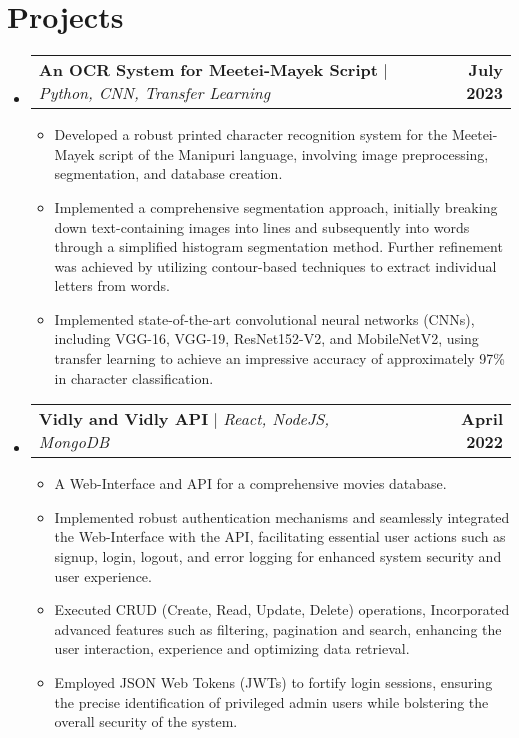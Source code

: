 \documentclass[letterpaper,11pt]{article}
\makeatletter
\newcommand{\resumeItem}[1]{
  \item\small{
    {#1 \vspace{-2pt}}
  }
}
\newcommand{\resumeProjectHeading}[2]{
    \item
    \begin{tabular*}{1.001\textwidth}{l@{\extracolsep{\fill}}r}
      \small#1 & \textbf{\small #2}\\
    \end{tabular*}\vspace{-7pt}
}
\newcommand{\resumeSubHeadingListStart}{\begin{itemize}[leftmargin=0.0in, label={}]}
\newcommand{\resumeSubHeadingListEnd}{\end{itemize}}
\newcommand{\resumeItemListStart}{\begin{itemize}}
\newcommand{\resumeItemListEnd}{\end{itemize}\vspace{-5pt}}
\makeatother
\begin{document}
\section{Projects}
\vspace{-5pt}
\resumeSubHeadingListStart
\resumeProjectHeading
{\textbf{An OCR System for Meetei-Mayek Script} $|$ \emph{Python, CNN, Transfer Learning}}{July 2023}
\resumeItemListStart
\resumeItem{Developed a robust printed character recognition system for the Meetei-Mayek script of the Manipuri language, involving image preprocessing, segmentation, and database creation.}
\resumeItem{Implemented a comprehensive segmentation approach, initially breaking down text-containing images into lines and subsequently into words through a simplified histogram segmentation method. Further refinement was achieved by utilizing contour-based techniques to extract individual letters from words.}
\resumeItem{Implemented state-of-the-art convolutional neural networks (CNNs), including VGG-16, VGG-19, ResNet152-V2, and MobileNetV2, using transfer learning to achieve an impressive accuracy of approximately 97\% in character classification.} \vspace{-10pt}
\resumeItemListEnd
\vspace{-13pt}
\resumeProjectHeading
{\textbf{Vidly and Vidly API} $|$ \emph{React, NodeJS, MongoDB}}{April 2022}
\resumeItemListStart
\resumeItem{A Web-Interface and API for a comprehensive movies database.}
\resumeItem{Implemented robust authentication mechanisms and seamlessly integrated the Web-Interface with the API, facilitating essential user actions such as signup, login, logout, and error logging for enhanced system security and user experience.}
\resumeItem{Executed CRUD (Create, Read, Update, Delete) operations, Incorporated advanced features such as filtering, pagination and search, enhancing the user interaction, experience and optimizing data retrieval.}
\resumeItem{Employed JSON Web Tokens (JWTs) to fortify login sessions, ensuring the precise identification of privileged admin users while bolstering the overall security of the system.}
\resumeItemListEnd
\vspace{-13pt}
\resumeSubHeadingListEnd
\vspace{-5pt}
\end{document}
